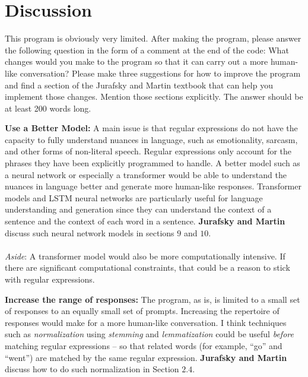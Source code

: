 \section{Discussion}

This program is obviously very limited. After making the program, please answer the following question
in the form of a comment at the end of the code: What changes would you make to the program so
that it can carry out a more human-like conversation? Please make three suggestions for how to
improve the program and find a section of the Jurafsky and Martin textbook that can help you
implement those changes. Mention those sections explicitly. The answer should be at least 200 words
long.

\begin{enumarabic}
  \item \textbf{Use a Better Model:}
    A main issue is that regular expressions do not have the capacity to
    fully understand nuances in language, such as emotionality, sarcasm,
    and other forms of non-literal speech.
    Regular expressions only account for the phrases they have been explicitly
    programmed to handle. A better model such as a neural network
    or especially a transformer would be able to understand the nuances
    in language better and generate more human-like responses.
    Transformer models and LSTM neural networks are particularly
    useful for language understanding and generation
    since they can understand the context of a sentence
    and the context of each word in a sentence.
    \textbf{Jurafsky and Martin} discuss such neural network
    models in sections $9$ and $10$. \\ \\
    \emph{Aside}: A transformer model would also be more computationally
      intensive. If there are significant computational constraints,
      that could be a reason to stick with regular expressions.

  \item \textbf{Increase the range of responses:}
    The program, as is, is limited to a small set of responses
    to an equally small set of prompts.
    Increasing the repertoire of responses would make for a
    more human-like conversation.
    I think techniques such as \emph{normalization} using
    \emph{stemming} and \emph{lemmatization} could be useful
    \emph{before} matching regular expressions -- so that
    related words (for example, ``go'' and ``went'') are matched by the same regular expression.
    \textbf{Jurafsky and Martin} discuss how to do such normalization
    in Section $2.4$.


\end{enumarabic}
